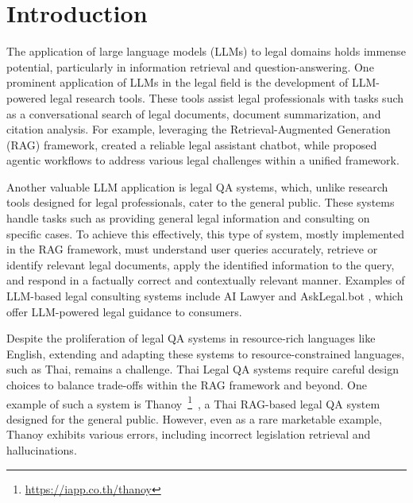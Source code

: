 \section{Introduction}
\label{sec:introduction}

The application of large language models (LLMs) to legal domains holds immense potential, particularly in information retrieval and question-answering.
%
One prominent application of LLMs in the legal field is the development of LLM-powered legal research tools. 
%
These tools assist legal professionals with tasks such as a conversational search of legal documents, document summarization, and citation analysis. 
%
For example, leveraging the Retrieval-Augmented Generation (RAG) framework, \cite{lexisnexis,thomsonreutersAIpoweredLegal} created a reliable legal assistant chatbot, while \cite{leewayhertzAgentsLegal} proposed agentic workflows to address various legal challenges within a unified framework.

Another valuable LLM application is legal QA systems, which, unlike research tools designed for legal professionals, cater to the general public. 
%
These systems handle tasks such as providing general legal information and consulting on specific cases. 
%
To achieve this effectively, this type of system, mostly implemented in the RAG framework, must understand user queries accurately, retrieve or identify relevant legal documents, apply the identified information to the query, and respond in a factually correct and contextually relevant manner. 
%
Examples of LLM-based legal consulting systems include AI Lawyer \cite{ailawyerLawyerYour} and AskLegal.bot \cite{asklegalAskLegalbotLegal}, which offer LLM-powered legal guidance to consumers.

Despite the proliferation of legal QA systems in resource-rich languages like English, extending and adapting these systems to resource-constrained languages, such as Thai, remains a challenge. 
%
Thai Legal QA systems require careful design choices to balance trade-offs within the RAG framework and beyond. One example of such a system is Thanoy~\footnote{\href{https://iapp.co.th/thanoy}{https://iapp.co.th/thanoy}}~\cite{thanoy}, a Thai RAG-based legal QA system designed for the general public. 
%
However, even as a rare marketable example, Thanoy exhibits various errors, including incorrect legislation retrieval and hallucinations.

